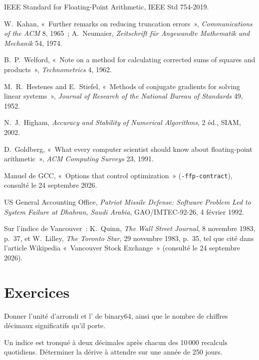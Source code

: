 \begin{omsources}
\item IEEE Standard for Floating-Point Arithmetic, IEEE Std 754-2019.
\item W.~Kahan, «~Further remarks on reducing truncation errors~», \emph{Communications of the ACM} 8, 1965~; A.~Neumaier, \emph{Zeitschrift für Angewandte Mathematik und Mechanik} 54, 1974.
\item B.~P.~Welford, «~Note on a method for calculating corrected sums of squares and products~», \emph{Technometrics} 4, 1962.
\item M.~R.~Hestenes and E.~Stiefel, «~Methods of conjugate gradients for solving linear systems~», \emph{Journal of Research of the National Bureau of Standards} 49, 1952.
\item N.~J.~Higham, \emph{Accuracy and Stability of Numerical Algorithms}, 2 éd., SIAM, 2002.
\item D.~Goldberg, «~What every computer scientist should know about floating-point arithmetic~», \emph{ACM Computing Surveys} 23, 1991.
\item Manuel de GCC, «~Options that control optimization~» (\texttt{-ffp-contract}), consulté le 24 septembre 2026.
\item US General Accounting Office, \emph{Patriot Missile Defense: Software Problem Led to System Failure at Dhahran, Saudi Arabia}, GAO/IMTEC-92-26, 4 février 1992.
\item Sur l'indice de Vancouver~: K.~Quinn, \emph{The Wall Street Journal}, 8 novembre 1983, p.~37, et W.~Lilley, \emph{The Toronto Star}, 29 novembre 1983, p.~35, tel que cité dans l'article Wikipedia
«~Vancouver Stock Exchange~» (consulté le 24 septembre 2026).
\end{omsources}

\section{Exercices}

\begin{exercise}[$\star$]\label{exo:qm:floating-point-and-numerical-linear-algebra:1}
Donner l'unité d'arrondi et l' de binary64, ainsi que le nombre de chiffres décimaux significatifs qu'il porte.
\end{exercise}

\begin{exercise}[$\star$]\label{exo:qm:floating-point-and-numerical-linear-algebra:2}
Un indice est tronqué à deux décimales après chacun des 10\,000 recalculs quotidiens. Déterminer la dérive à attendre sur une année de 250 jours.
\end{exercise}

